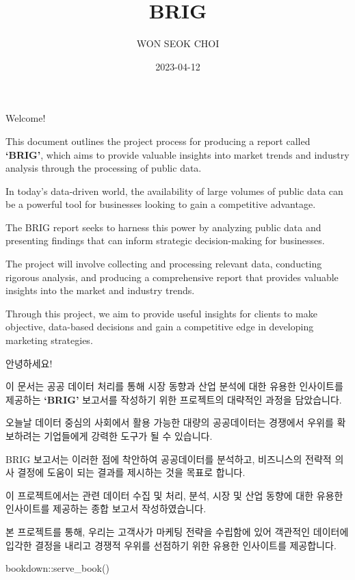 \documentclass[
]{book}
\title{BRIG}
\author{WON SEOK CHOI}
\date{2023-04-12}
\newenvironment{Shaded}{\begin{snugshade}}{\end{snugshade}}
\newcommand{\FunctionTok}[1]{\textcolor[rgb]{0.00,0.00,0.00}{#1}}
\newcommand{\NormalTok}[1]{#1}
\newcommand{\SpecialCharTok}[1]{\textcolor[rgb]{0.00,0.00,0.00}{#1}}
\begin{document}
\maketitle

{
\setcounter{tocdepth}{1}
\tableofcontents
}
Welcome!

This document outlines the project process for producing a report called \textbf{`BRIG'}, which aims to provide valuable insights into market trends and industry analysis through the processing of public data.

In today's data-driven world, the availability of large volumes of public data can be a powerful tool for businesses looking to gain a competitive advantage.

The BRIG report seeks to harness this power by analyzing public data and presenting findings that can inform strategic decision-making for businesses.

The project will involve collecting and processing relevant data, conducting rigorous analysis, and producing a comprehensive report that provides valuable insights into the market and industry trends.

Through this project, we aim to provide useful insights for clients to make objective, data-based decisions and gain a competitive edge in developing marketing strategies.

안녕하세요!

이 문서는 공공 데이터 처리를 통해 시장 동향과 산업 분석에 대한 유용한 인사이트를 제공하는 \textbf{`BRIG'} 보고서를 작성하기 위한 프로젝트의 대략적인 과정을 담았습니다.

오늘날 데이터 중심의 사회에서 활용 가능한 대량의 공공데이터는 경쟁에서 우위를 확보하려는 기업들에게 강력한 도구가 될 수 있습니다.

BRIG 보고서는 이러한 점에 착안하여 공공데이터를 분석하고, 비즈니스의 전략적 의사 결정에 도움이 되는 결과를 제시하는 것을 목표로 합니다.

이 프로젝트에서는 관련 데이터 수집 및 처리, 분석, 시장 및 산업 동향에 대한 유용한 인사이트를 제공하는 종합 보고서 작성하였습니다.

본 프로젝트를 통해, 우리는 고객사가 마케팅 전략을 수립함에 있어 객관적인 데이터에 입각한 결정을 내리고 경쟁적 우위를 선점하기 위한 유용한 인사이트를 제공합니다.

\begin{Shaded}
\begin{Highlighting}[]
\NormalTok{bookdown}\SpecialCharTok{::}\FunctionTok{serve\_book}\NormalTok{()}
\end{Highlighting}
\end{Shaded}
\end{document}
